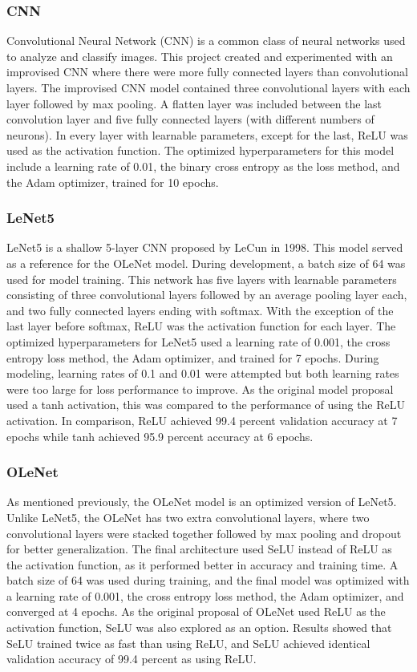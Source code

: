 \documentclass[conference]{IEEEtran}
\begin{document}
\subsubsection{CNN}
Convolutional Neural Network (CNN) is a common class of neural networks used to analyze and classify images. This project created and experimented with an improvised CNN where there were more fully connected layers than convolutional layers. The improvised CNN model contained three convolutional layers with each layer followed by max pooling. A flatten layer was included between the last convolution layer and five fully connected layers (with different numbers of neurons). In every layer with learnable parameters, except for the last, ReLU was used as the activation function. The optimized hyperparameters for this model include a learning rate of 0.01, the binary cross entropy as the loss method, and the Adam optimizer, trained for 10 epochs.
\subsubsection{LeNet5}
LeNet5 is a shallow 5-layer CNN proposed by LeCun in 1998. This model served as a reference for the OLeNet model. During development, a batch size of 64 was used for model training. This network has five layers with learnable parameters consisting of three convolutional layers followed by an average pooling layer each, and two fully connected layers ending with softmax. With the exception of the last layer before softmax, ReLU was the activation function for each layer. The optimized hyperparameters for LeNet5 used a learning rate of 0.001, the cross entropy loss method, the Adam optimizer, and trained for 7 epochs. During modeling, learning rates of 0.1 and 0.01 were attempted but both learning rates were too large for loss performance to improve. As the original model proposal used a tanh activation, this was compared to the performance of using the ReLU activation. In comparison, ReLU achieved 99.4 percent validation accuracy at 7 epochs while tanh achieved 95.9 percent accuracy at 6 epochs.
\subsubsection{OLeNet}
As mentioned previously, the OLeNet model is an optimized version of LeNet5. Unlike LeNet5, the OLeNet has two extra convolutional layers, where two convolutional layers were stacked together followed by max pooling and dropout for better generalization. The final architecture used SeLU instead of ReLU as the activation function, as it performed better in accuracy and training time. A batch size of 64 was used during training, and the final model was optimized with a learning rate of 0.001, the cross entropy loss method, the Adam optimizer, and converged at 4 epochs. As the original proposal of OLeNet used ReLU as the activation function, SeLU was also explored as an option. Results showed that SeLU trained twice as fast than using ReLU, and SeLU achieved identical validation accuracy of 99.4 percent as using ReLU.
\end{document}
